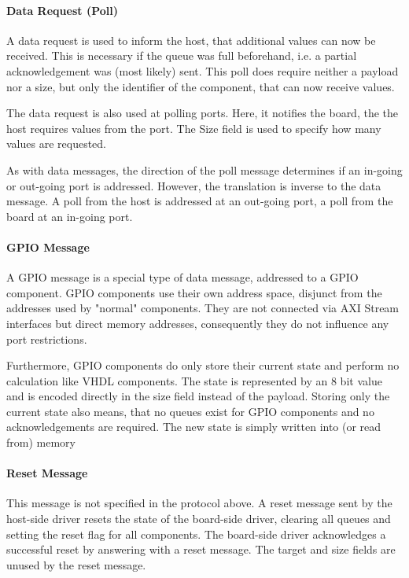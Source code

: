 \documentclass{report}
\begin{document}
\paragraph{Data Request (Poll)}
A data request is used to inform the host, that additional values can now be received. This is necessary if the queue was full beforehand, i.e. a partial acknowledgement was (most likely) sent. This poll does require neither a payload nor a size, but only the identifier of the component, that can now receive values.

The data request is also used at polling ports. Here, it notifies the board, the the host requires values from the port. The Size field is used to specify how many values are requested.

As with data messages, the direction of the poll message determines if an in-going or out-going port is addressed. However, the translation is inverse to the data message. A poll from the host is addressed at an out-going port, a poll from the board at an in-going port.

\paragraph{GPIO Message}
A GPIO message is a special type of data message, addressed to a GPIO component. GPIO components use their own address space, disjunct from the addresses used by "normal" components. They are not connected via AXI Stream interfaces but direct memory addresses, consequently they do not influence any port restrictions.

Furthermore, GPIO components do only store their current state and perform no calculation like VHDL components. The state is represented by an 8 bit value and is encoded directly in the size field instead of the payload. Storing only the current state also means, that no queues exist for GPIO components and no acknowledgements are required. The new state is simply written into (or read from) memory

\paragraph{Reset Message}
This message is not specified in the protocol above. A reset message sent by the host-side driver resets the state of the board-side driver, clearing all queues and setting the reset flag for all components. The board-side driver acknowledges a successful reset by answering with a reset message. 
The target and size fields are unused by the reset message.
\end{document}
